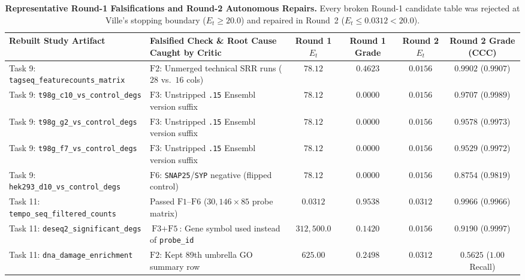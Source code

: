 \documentclass[10pt,twocolumn]{article}
\begin{document}
\begin{table}[t]
\centering
\caption{\textbf{Representative Round-1 Falsifications and Round-2 Autonomous Repairs.} Every broken Round-1 candidate table was rejected at Ville's stopping boundary ($E_t \ge 20.0$) and repaired in Round~2 ($E_t \le 0.0312 < 20.0$).}
\label{tab:failure_modes}
\vspace{4pt}
\small
\begin{tabular}{llcccc}
\toprule
\textbf{Rebuilt Study Artifact} & \textbf{Falsified Check \& Root Cause Caught by Critic} & \textbf{Round 1 $E_t$} & \textbf{Round 1 Grade} & \textbf{Round 2 $E_t$} & \textbf{Round 2 Grade (CCC)} \\
\midrule
Task 9: \texttt{tagseq\_featurecounts\_matrix} & $\text{F2}$: Unmerged technical SRR runs ($28$ vs.\ $16$ cols) & $78.12$ & $0.4623$ & $0.0156$ & $\mathbf{0.9902}$ ($0.9907$) \\
Task 9: \texttt{t98g\_c10\_vs\_control\_degs} & $\text{F3}$: Unstripped \texttt{.15} Ensembl version suffix & $78.12$ & $0.0000$ & $0.0156$ & $\mathbf{0.9707}$ ($0.9989$) \\
Task 9: \texttt{t98g\_g2\_vs\_control\_degs} & $\text{F3}$: Unstripped \texttt{.15} Ensembl version suffix & $78.12$ & $0.0000$ & $0.0156$ & $\mathbf{0.9578}$ ($0.9973$) \\
Task 9: \texttt{t98g\_f7\_vs\_control\_degs} & $\text{F3}$: Unstripped \texttt{.15} Ensembl version suffix & $78.12$ & $0.0000$ & $0.0156$ & $\mathbf{0.9529}$ ($0.9972$) \\
Task 9: \texttt{hek293\_d10\_vs\_control\_degs} & $\text{F6}$: \texttt{SNAP25}/\texttt{SYP} negative (flipped control) & $78.12$ & $0.0000$ & $0.0156$ & $\mathbf{0.8754}$ ($0.9819$) \\
Task 11: \texttt{tempo\_seq\_filtered\_counts} & Passed $\text{F1}$--$\text{F6}$ ($30{,}146 \times 85$ probe matrix) & $0.0312$ & $0.9538$ & $0.0312$ & $\mathbf{0.9966}$ ($0.9966$) \\
Task 11: \texttt{deseq2\_significant\_degs} & $\text{F3}+\text{F5}$: Gene symbol used instead of \texttt{probe\_id} & $312{,}500.0$ & $0.1420$ & $0.0156$ & $\mathbf{0.9190}$ ($0.9997$) \\
Task 11: \texttt{dna\_damage\_enrichment} & $\text{F2}$: Kept 89th umbrella GO summary row & $625.00$ & $0.2498$ & $0.0312$ & $\mathbf{0.5625}$ ($1.00$ Recall) \\
\bottomrule
\end{tabular}
\end{table}
\end{document}
